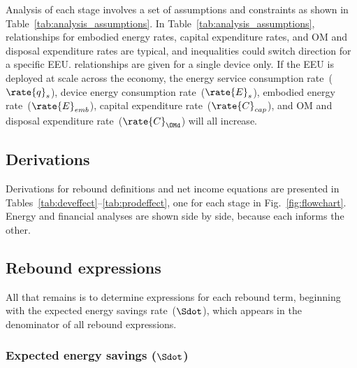 Analysis of each stage involves a set of assumptions and constraints
as shown in Table~\ref{tab:analysis_assumptions}.
In Table~\ref{tab:analysis_assumptions}, 
relationships for \lceffect{} 
embodied energy rates, 
capital expenditure rates, and 
OM and disposal expenditure rates
are typical, and
inequalities could switch direction for a specific EEU.
\Prodeffect{} relationships are given for a single device only.
If the EEU is deployed at scale across the economy, 
the energy service consumption rate~($\rate{q}_s$), 
device energy consumption rate~($\rate{E}_s$), 
embodied energy rate~($\rate{E}_{emb}$),
capital expenditure rate~($\rate{C}_{cap}$), and 
OM and disposal expenditure rate~($\rate{C}_{\OMd}$)
will all increase.




\subsection{Derivations}
\label{sec:derivations}

Derivations for rebound definitions and net income equations
are presented in Tables~\ref{tab:deveffect}--\ref{tab:prodeffect},
one for each stage in Fig.~\ref{fig:flowchart}.
Energy and financial analyses are shown side by side, because
each informs the other.

















\subsection{Rebound expressions}
\label{sec:rebound_expressions}

All that remains is to determine expressions for each rebound term, 
beginning with the expected energy savings rate~($\Sdot$), which
appears in the denominator of all rebound expressions.


\subsubsection{Expected energy savings ($\Sdot$)} 
\label{sec:Sdot}

